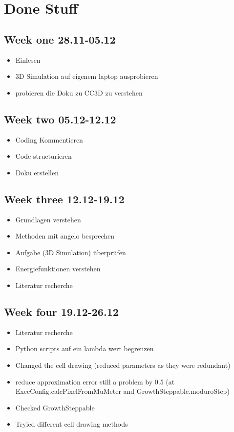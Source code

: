 \chapter{Done Stuff}

\section{Week one 28.11-05.12}
\begin{itemize}
\item Einlesen
\item 3D Simulation auf eigenem laptop ausprobieren
\item probieren die Doku zu CC3D zu verstehen
\end{itemize}

\section{Week two 05.12-12.12}
\begin{itemize}
\item Coding Kommentieren
\item Code structurieren
\item Doku erstellen
\end{itemize}

\section{Week three 12.12-19.12}
\begin{itemize}
\item Grundlagen verstehen
\item Methoden mit angelo besprechen
\item Aufgabe (3D Simulation) überprüfen
\item Energiefunktionen verstehen
\item Literatur recherche 
\end{itemize}

\section{Week four 19.12-26.12}
\begin{itemize}
\item Literatur recherche
\item Python scripts auf ein lambda wert begrenzen
\item Changed the cell drawing (reduced parameters as they were redundant)
\item reduce approximation error  still a problem by 0.5 (at ExecConfig.calcPixelFromMuMeter and GrowthSteppable.moduroStep)
\item Checked GrowthSteppable
\item Tryied different cell drawing methods
\end{itemize}

